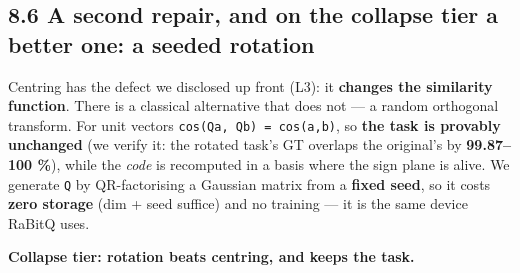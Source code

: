\documentclass[
  10pt,
]{article}
\begin{document}
\subsection{8.6 A second repair, and on the collapse tier a better one:
a seeded
rotation}\label{a-second-repair-and-on-the-collapse-tier-a-better-one-a-seeded-rotation}

Centring has the defect we disclosed up front (L3): it \textbf{changes
the similarity function}. There is a classical alternative that does not
--- a random orthogonal transform. For unit vectors
\texttt{cos(Qa,\ Qb)\ =\ cos(a,b)}, so \textbf{the task is provably
unchanged} (we verify it: the rotated task's GT overlaps the original's
by \textbf{99.87--100 \%}), while the \emph{code} is recomputed in a
basis where the sign plane is alive. We generate \texttt{Q} by
QR-factorising a Gaussian matrix from a \textbf{fixed seed}, so it costs
\textbf{zero storage} (dim + seed suffice) and no training --- it is the
same device RaBitQ uses.

\textbf{Collapse tier: rotation beats centring, and keeps the task.}
\end{document}
